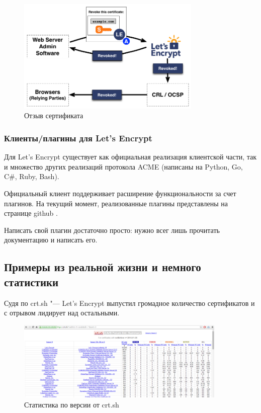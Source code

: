 \documentclass[10pt, a5paper]{article}
\begin{document}
\begin{figure}[h!]
  \centering
  \includegraphics[height=5.5cm]{w_03_2016_Kharkevich10.png}
\caption*{Отзыв сертификата}\label{fig:Kharkevich10}
\end{figure}


\subsubsection*{Клиенты/плагины для Let's Encrypt}

Для Let’s Encrypt существует как официальная реализация клиентской части, так и множество других реализаций протокола \linebreak ACME (написаны на Python, Go, C\#, Ruby, Bash).

Официальный клиент поддерживает расширение функциональности за счет плагинов. На текущий момент, реализованные плагины представлены на странице github \footnotemark[5].

Написать свой плагин достаточно просто: нужно всег лишь прочитать документацию \footnotemark[6] и написать его.

\subsection*{Примеры из реальной жизни и немного статистики}

Судя по crt.sh "--- Let's Encrypt выпустил громадное количество сертификатов и с отрывом лидирует над остальными.

\begin{figure}[h!]
  \centering
  \includegraphics[width=10cm]{w_03_2016_Kharkevich11.png}
\caption*{Статистика по версии от crt.sh}\label{fig:Kharkevich11}
\end{figure}
\end{document}
